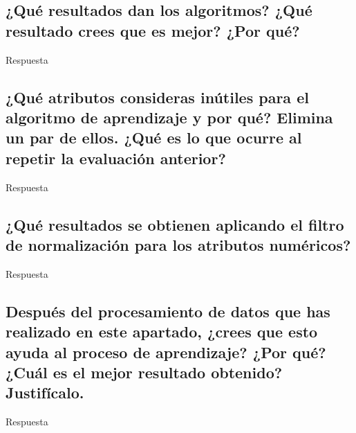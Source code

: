 \documentclass[12pt]{article}
\begin{document}
\subsection*{\small ¿Qué resultados dan los algoritmos? ¿Qué resultado crees que
es mejor? ¿Por qué?}

Respuesta

\subsection*{\small ¿Qué atributos consideras inútiles para el algoritmo de
aprendizaje y por qué? Elimina un par de ellos. ¿Qué es lo que ocurre al
repetir la evaluación anterior?}

Respuesta

\subsection*{\small ¿Qué resultados se obtienen aplicando el filtro de
normalización para los atributos numéricos?}

Respuesta

\subsection*{\small Después del procesamiento de datos que has realizado en este
apartado, ¿crees que esto ayuda al proceso de aprendizaje? ¿Por qué? ¿Cuál es
el mejor resultado obtenido? Justifícalo.}

Respuesta
\end{document}
